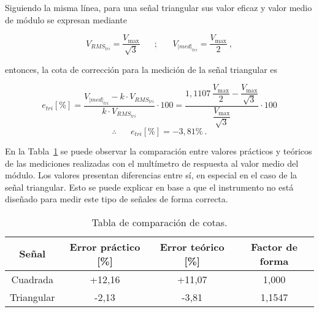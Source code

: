     Siguiendo la misma línea, para una señal triangular sus valor eficaz y valor
    medio de módulo se expresan mediante

    \vspace{-5pt}
$$ V_{RMS_{tri}} = \dfrac{V_{\max}}{\sqrt{3}} \hspace{20pt} ; \hspace{20pt} V_{|med|_{tri}} = \dfrac{V_{\max}}{2}~, $$

    \noindent entonces, la cota de corrección para la medición de 
    la señal triangular es

    \vspace{-5pt}
    $$ e_{tri} [\%] = \dfrac{V_{|med|_{tri}} - k\cdot V_{RMS_{tri}}}{k \cdot V_{RMS_{tri}}} \cdot 100
    = \dfrac{ 1,1107\, \dfrac{V_{\max}}{2} - \dfrac{V_{\max}}{\sqrt{3}} }{\dfrac{V_{\max}}{\sqrt{3}}} \cdot 100 $$
              $$  \therefore \hspace{20pt} \boxed{e_{tri}[\%] = -3,81\%}~.
    $$

    En la Tabla~\ref{tab:ComparacionCotas} se puede observar la comparación entre valores
    prácticos y teóricos de las mediciones realizadas con el multímetro de respuesta al 
    valor medio del módulo. Los valores presentan diferencias entre sí, en especial
    en el caso de la señal triangular. Esto se puede explicar en base a que el
    instrumento no está diseñado para medir este tipo de señales de forma correcta. 

    \begin{table}[H] \centering
      \begin{tabular}{|c|c|c|c|} \hline
        \textbf{Señal}       & \textbf{Error práctico [\%]}  & \textbf{Error teórico [\%]} & \textbf{Factor de forma} \\ \hline
        Cuadrada    & +12,16               & +11,07              &  1,000              \\ \hline
        Triangular  & -2,13                & -3,81              &  1,1547         \\ \hline
      \end{tabular}
      \caption{Tabla de comparación de cotas.}
      \label{tab:ComparacionCotas}
    \end{table}









